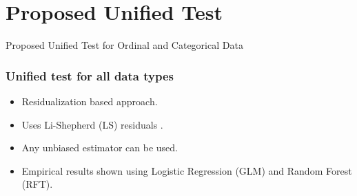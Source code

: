 \documentclass{beamer}
\begin{document}


\section{Proposed Unified Test}
\begin{frame}
	\begin{center} \Huge{Proposed Unified Test for Ordinal and Categorical Data} \end{center}
\end{frame}
\begin{frame}
	\frametitle{Unified test for all data types}
	\begin{itemize}
		\setlength\itemsep{1em}
		\item Residualization based approach.
		\item Uses Li-Shepherd (LS) residuals \footnotemark.
		\item Any unbiased estimator can be used.
		\item Empirical results shown using Logistic Regression (GLM) and Random Forest (RFT).
	\end{itemize}
\end{frame}
\end{document}
